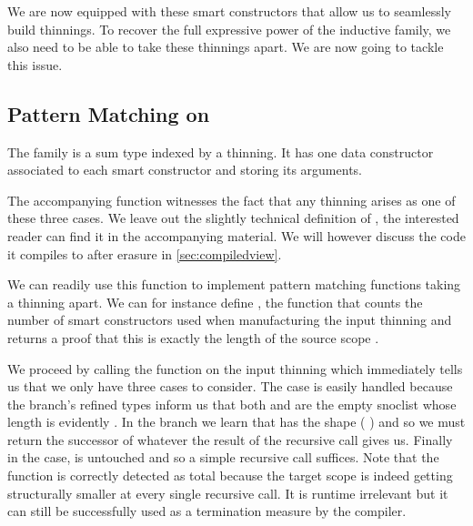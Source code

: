 
We are now equipped with these smart constructors that allow us to seamlessly
build thinnings.
%
To recover the full expressive power of the inductive family, we also need to
be able to take these thinnings apart. We are now going to tackle this issue.

\subsection{Pattern Matching on }

The  family is a sum type indexed by a thinning. It has one
data constructor associated to each smart constructor and storing its arguments.


The accompanying  function witnesses the fact that any
thinning arises as one of these three cases.
%
We leave out the slightly technical definition of , the
interested reader can find it in the accompanying material.
%
We will however discuss the code it compiles to after erasure in
\cref{sec:compiledview}.


We can readily use this function to implement pattern matching functions taking
a thinning apart. We can for instance define , the function
that counts the number of  smart constructors used when
manufacturing the input thinning and returns a proof that this is exactly the
length of the source scope .


We proceed by calling the  function on the input thinning
which immediately tells us that we only have three cases to consider.
%
The  case is easily handled because the branch's refined
types inform us that both  and  are the
empty snoclist \IdrisData{[<]} whose length is evidently .
%
In the  branch we learn that  has the shape
(\IdrisBound{\KatlaUnderscore} \IdrisData{:<} ) and so we must return the
successor of whatever the result of the recursive call gives us.
%
Finally in the  case,  is untouched and so a
simple recursive call suffices.
%
Note that the function is correctly detected as total because the target scope
 is indeed getting structurally smaller at every single recursive
call.
%
It is runtime irrelevant but it can still be successfully used as a termination
measure by the compiler.

